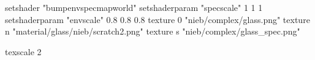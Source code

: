 setshader "bumpenvspecmapworld"
setshaderparam "specscale" 1 1 1
setshaderparam "envscale"  0.8 0.8 0.8
   texture 0 "nieb/complex/glass.png"
   texture n "material/glass/nieb/scratch2.png"
   texture s "nieb/complex/glass_spec.png"

texscale 2
